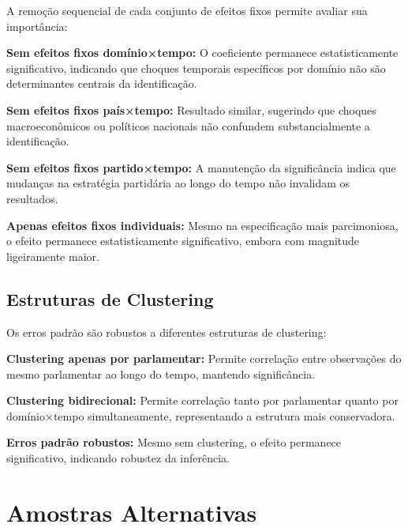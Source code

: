 
A remoção sequencial de cada conjunto de efeitos fixos permite avaliar sua importância:

\begin{landscape}
    \centering
    \label{tab:robustness_main}
    
\end{landscape}

\textbf{Sem efeitos fixos domínio×tempo:} O coeficiente permanece estatisticamente significativo, indicando que choques temporais específicos por domínio não são determinantes centrais da identificação.

\textbf{Sem efeitos fixos país×tempo:} Resultado similar, sugerindo que choques macroeconômicos ou políticos nacionais não confundem substancialmente a identificação.

\textbf{Sem efeitos fixos partido×tempo:} A manutenção da significância indica que mudanças na estratégia partidária ao longo do tempo não invalidam os resultados.

\textbf{Apenas efeitos fixos individuais:} Mesmo na especificação mais parcimoniosa, o efeito permanece estatisticamente significativo, embora com magnitude ligeiramente maior.

\subsection{Estruturas de Clustering}

Os erros padrão são robustos a diferentes estruturas de clustering:

\textbf{Clustering apenas por parlamentar:} Permite correlação entre observações do mesmo parlamentar ao longo do tempo, mantendo significância.

\textbf{Clustering bidirecional:} Permite correlação tanto por parlamentar quanto por domínio×tempo simultaneamente, representando a estrutura mais conservadora.

\textbf{Erros padrão robustos:} Mesmo sem clustering, o efeito permanece significativo, indicando robustez da inferência.

\section{Amostras Alternativas}

